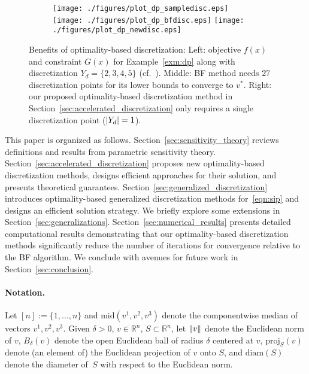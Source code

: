 \documentclass{article}
\DeclarePairedDelimiter\abs{\lvert}{\rvert}%
\DeclarePairedDelimiter\norm{\lVert}{\rVert}%
\newcommand{\R}{\mathbb{R}}
\newcommand{\1}[1]{\mathds{1}\left[#1\right]}
\begin{document}
\begin{figure}[t]
\centering
\begin{subfigure}{\textwidth}
\texttt{[image: ./figures/plot\_dp\_sampledisc.eps]}%
\hfill
\texttt{[image: ./figures/plot\_dp\_bfdisc.eps]}%
\hfill
\texttt{[image: ./figures/plot\_dp\_newdisc.eps]}
\end{subfigure}
\caption{
Benefits of optimality-based discretization: 
Left: objective $f(x)$ and constraint $G(x)$ for Example~\ref{exm:dp} along with discretization $Y_d = \{2,3,4,5\}$ (cf.\ \citep[Figure~3.1]{djelassi2020discretization}). 
 Middle: BF method needs $27$ discretization points for its lower bounds to converge to $v^*$.
Right: our proposed optimality-based discretization method in Section~\ref{sec:accelerated_discretization} only requires a single discretization point ($\abs{Y_d} = 1$).
}
\label{fig:plot_dp_bf}
\end{figure}


This paper is organized as follows.
Section~\ref{sec:sensitivity_theory} reviews definitions and results from parametric sensitivity theory. 
Section~\ref{sec:accelerated_discretization} proposes new optimality-based discretization methods, designs efficient approaches for their solution, and presents theoretical guarantees.
Section~\ref{sec:generalized_discretization} introduces optimality-based generalized discretization methods for~\eqref{eqn:sip} and designs an efficient solution strategy.
We briefly explore some extensions in Section~\ref{sec:generalizations}.
Section~\ref{sec:numerical_results} presents detailed computational results demonstrating that our optimality-based discretization methods significantly reduce the number of iterations for convergence relative to the BF algorithm.
We conclude with avenues for future work in Section~\ref{sec:conclusion}.


\paragraph*{Notation.} Let $[n] := \{1,\dots,n\}$ and $\text{mid}(v^1,v^2,v^3)$ denote the componentwise median of vectors $v^1, v^2, v^3$. Given $\delta > 0$, $v \in \R^n$, $S \subset \R^n$, let $\norm{v}$ denote the Euclidean norm of $v$, $B_{\delta}(v)$ denote the open Euclidean ball of radius $\delta$ centered at $v$, $\text{proj}_S(v)$ denote (an element of) the Euclidean projection of $v$ onto $S$, and $\text{diam}(S)$ denote the diameter of~$S$ with respect to the Euclidean norm.
\end{document}
